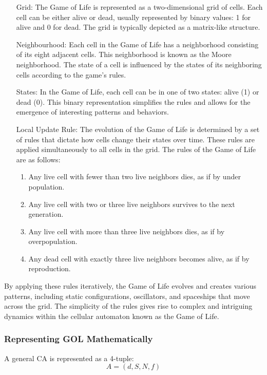\begin{enumerate}[align=left]
	\item[Grid:] The Game of Life is represented as a two-dimensional grid of cells. Each cell can be either alive or dead, usually represented by binary values: 1 for alive and 0 for dead. The grid is typically depicted as a matrix-like structure.
	\item[Neighbourhood:] Each cell in the Game of Life has a neighborhood consisting of its eight adjacent cells. This neighborhood is known as the Moore neighborhood. The state of a cell is influenced by the states of its neighboring cells according to the game's rules.
	\item[States:] In the Game of Life, each cell can be in one of two states: alive (1) or dead (0). This binary representation simplifies the rules and allows for the emergence of interesting patterns and behaviors.
	\item[Local Update Rule:] The evolution of the Game of Life is determined by a set of rules that dictate how cells change their states over time. These rules are applied simultaneously to all cells in the grid. The rules of the Game of Life are as follows:
	\begin{enumerate}
		\item Any live cell with fewer than two live neighbors dies, as if by under population.
		\item Any live cell with two or three live neighbors survives to the next generation.
		\item Any live cell with more than three live neighbors dies, as if by overpopulation.
		\item Any dead cell with exactly three live neighbors becomes alive, as if by reproduction.
	\end{enumerate}
\end{enumerate}

By applying these rules iteratively, the Game of Life evolves and creates various patterns, including static configurations, oscillators, and spaceships that move across the grid. The simplicity of the rules gives rise to complex and intriguing dynamics within the cellular automaton known as the Game of Life.

\subsubsection*{Representing GOL Mathematically}

 A general CA is represented as a 4-tuple:
\begin{equation}
	A = (d, S, N, f)
\end{equation}

